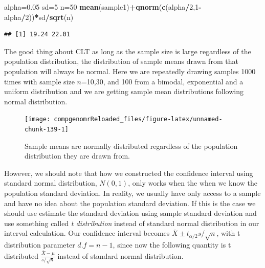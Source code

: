 \documentclass[12pt,]{krantz}
\newenvironment{Shaded}{\begin{snugshade}}{\end{snugshade}}
\newcommand{\DecValTok}[1]{\textcolor[rgb]{0.00,0.00,0.81}{#1}}
\newcommand{\FloatTok}[1]{\textcolor[rgb]{0.00,0.00,0.81}{#1}}
\newcommand{\KeywordTok}[1]{\textcolor[rgb]{0.13,0.29,0.53}{\textbf{#1}}}
\newcommand{\NormalTok}[1]{#1}
\newcommand{\OperatorTok}[1]{\textcolor[rgb]{0.81,0.36,0.00}{\textbf{#1}}}
\begin{document}
\begin{Shaded}
\begin{Highlighting}[]
\NormalTok{alpha=}\FloatTok{0.05}
\NormalTok{sd=}\DecValTok{5}
\NormalTok{n=}\DecValTok{50}
\KeywordTok{mean}\NormalTok{(sample1)}\OperatorTok{+}\KeywordTok{qnorm}\NormalTok{(}\KeywordTok{c}\NormalTok{(alpha}\OperatorTok{/}\DecValTok{2}\NormalTok{,}\DecValTok{1}\OperatorTok{-}\NormalTok{alpha}\OperatorTok{/}\DecValTok{2}\NormalTok{))}\OperatorTok{*}\NormalTok{sd}\OperatorTok{/}\KeywordTok{sqrt}\NormalTok{(n)}
\end{Highlighting}
\end{Shaded}

\begin{verbatim}
## [1] 19.24 22.01
\end{verbatim}

The good thing about CLT as long as the sample size is large regardless of
the population distribution, the distribution of sample means drawn from
that population will always be normal. Here we are repeatedly
drawing samples 1000 times with sample size \(n\)=10,30, and 100 from a bimodal,
exponential and a uniform distribution and we are getting sample mean distributions
following normal distribution.

\begin{figure}

{\centering \texttt{[image: compgenomrReloaded\_files/figure-latex/unnamed-chunk-139-1]} 

}

\caption{Sample means are normally distributed regardless of the population distribution they are drawn from.}\label{fig:unnamed-chunk-139}
\end{figure}

However, we should note that how we constructed the confidence interval
using standard normal distribution, \(N(0,1)\), only works when the when we know the
population standard deviation. In reality, we usually have only access
to a sample and have no idea about the population standard deviation. If
this is the case we should use estimate the standard deviation using
sample standard deviation and use something called \emph{t distribution} instead
of standard normal distribution in our interval calculation. Our confidence interval becomes
\(\overline{X} \pm t_{\alpha/2}s/\sqrt{n}\), with t distribution
parameter \(d.f=n-1\), since now the following quantity is t distributed \(\frac{\overline{X}-\mu}{s/\sqrt{n}}\) instead of standard normal distribution.
\end{document}
